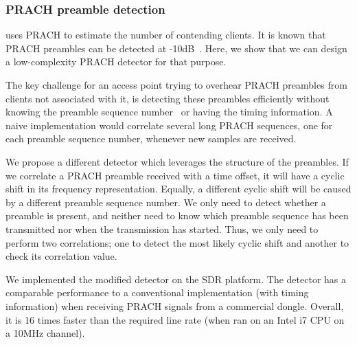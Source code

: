 



\subsubsection{PRACH preamble detection}
\label{sec:pracheval}

\cf uses PRACH to estimate the number of contending clients. 
It is known that PRACH preambles can be detected at -10dB~\cite{prach}.
Here, we show that we can design a low-complexity PRACH detector for that purpose.



The key challenge for an access point trying to overhear PRACH preambles from clients not associated with it, 
is detecting these preambles efficiently without knowing the preamble sequence number~\cite{LTEbullets} or having the timing information. 
A naive implementation would correlate several long PRACH sequences, one for each preamble sequence number, 
whenever new samples are received. 

We propose a different detector which leverages the structure of the preambles. 
If we correlate a PRACH preamble received with a time offset, it will have a cyclic shift in its frequency representation. 
Equally, a different cyclic shift will be caused by a different preamble sequence number. 
We only need to detect whether a preamble is present, and neither need to know which preamble sequence has been transmitted 
nor when the transmission has started. 
Thus, we only need to perform two correlations; one to detect the most likely cyclic shift and 
another to check its correlation value. 

We implemented the modified detector on the SDR platform.
The detector has a comparable performance to a conventional implementation (with timing information) 
when receiving PRACH signals from a commercial dongle. 
Overall, it is 16 times faster than the required line rate (when ran on an Intel i7 CPU on a 10MHz channel).





